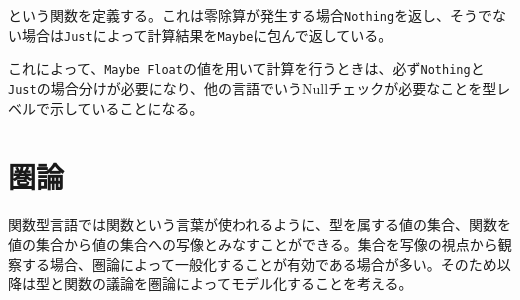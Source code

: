 \documentclass[uplatex,dvipdfmx]{jsarticle}
\newcommand{\pr}[1]{\colorbox[rgb]{0.9,0.9,0.9}{\lstinline{#1}}}
\begin{document}
  という関数を定義する。これは零除算が発生する場合\pr{Nothing}を返し、そうでない場合は\pr{Just}によって計算結果を\pr{Maybe}に包んで返している。

  これによって、\pr{Maybe Float}の値を用いて計算を行うときは、必ず\pr{Nothing}と\pr{Just}の場合分けが必要になり、他の言語でいうNullチェックが必要なことを型レベルで示していることになる。

  \section{圏論}
  関数型言語では関数という言葉が使われるように、型を属する値の集合、関数を値の集合から値の集合への写像とみなすことができる。集合を写像の視点から観察する場合、圏論によって一般化することが有効である場合が多い。そのため以降は型と関数の議論を圏論によってモデル化することを考える。
\end{document}
